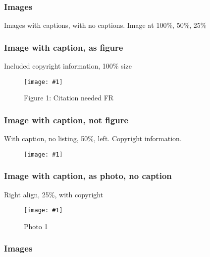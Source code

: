 \documentclass{article}
\newlength{\imgwidth}
\newcommand\scaledgraphics[2]{%
                
\settowidth{\imgwidth}{\texttt{[image: \#1]}}%
                
\setlength{\imgwidth}{\minof{\imgwidth}{#2\textwidth}}%
                
\texttt{[image: \#1]}%
                
}
\begin{document}
\subsubsection{Images}\label{H607067}



Images with captions, with no captions. Image at 100\%, 50\%, 25\%


\subsubsection{Image with caption, as figure}\label{H415836}



Included copyright information, 100\% size

\begin{figure}
\scaledgraphics{2112cd94-9504-4ac8-a467-c996ced73408.jpg}{1}
\caption*{Figure 1: Citation needed FR}\label{F27135281}
\end{figure}


\subsubsection{Image with caption, not figure}\label{H9577977}



With caption, no listing, 50\%, left. Copyright information.

\begin{wrapfigure}{l}{0.5\textwidth}
\scaledgraphics{d2133ec1-3584-435f-ae11-585197fe8785.jpg}{0.5}
\label{F35988861}
\end{wrapfigure}


\subsubsection{Image with caption, as photo, no caption}\label{H166321}



Right align, 25\%, with copyright

\begin{wrapfigure}{r}{0.25\textwidth}
\scaledgraphics{4610ab2c-b384-45c6-bea8-45345ff23871.png}{0.25}
\caption*{Photo 1}\label{F40137711}
\end{wrapfigure}


\subsubsection{Images}\label{H1357540}
\end{document}
